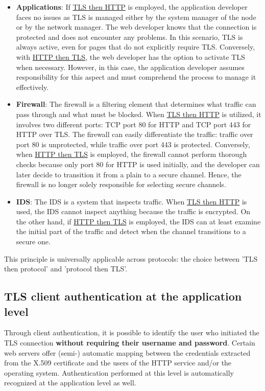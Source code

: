 \begin{itemize}
	\item \textbf{Applications}: If \underline{TLS then HTTP} is employed, the application developer faces no issues as TLS is managed either by the system manager of the node or by the network manager. The web developer knows that the connection is protected and does not encounter any problems. In this scenario, TLS is always active, even for pages that do not explicitly require TLS. Conversely, with \underline{HTTP then TLS}, the web developer has the option to activate TLS when necessary. However, in this case, the application developer assumes responsibility for this aspect and must comprehend the process to manage it effectively.

	\item \textbf{Firewall}: The firewall is a filtering element that determines what traffic can pass through and what must be blocked. When \underline{TLS then HTTP} is utilized, it involves two different ports: TCP port 80 for HTTP and TCP port 443 for HTTP over TLS. The firewall can easily differentiate the traffic: traffic over port 80 is unprotected, while traffic over port 443 is protected. Conversely, when \underline{HTTP then TLS} is employed, the firewall cannot perform thorough checks because only port 80 for HTTP is used initially, and the developer can later decide to transition it from a plain to a secure channel. Hence, the firewall is no longer solely responsible for selecting secure channels.

	\item \textbf{IDS}: The IDS is a system that inspects traffic. When \underline{TLS then HTTP} is used, the IDS cannot inspect anything because the traffic is encrypted. On the other hand, if \underline{HTTP then TLS} is employed, the IDS can at least examine the initial part of the traffic and detect when the channel transitions to a secure one.
\end{itemize}

This principle is universally applicable across protocols: the choice between 'TLS then protocol' and 'protocol then TLS'.


\subsection{TLS client authentication at the application level}

Through client authentication, it is possible to identify the user who initiated the TLS connection \textbf{without requiring their username and password}. Certain web servers offer (semi-) automatic mapping between the credentials extracted from the X.509 certificate and the users of the HTTP service and/or the operating system. Authentication performed at this level is automatically recognized at the application level as well.

